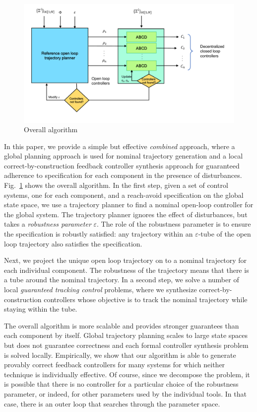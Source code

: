 \begin{figure}[t]
\includegraphics[scale=0.28]{figures/Algorithm_outline.pdf}
\caption{Overall algorithm\label{fig:overall}}
\end{figure}

In this paper, we provide a simple but effective \emph{combined} approach, where a global planning approach is used for nominal trajectory generation and 
a local correct-by-construction feedback controller synthesis approach for guaranteed adherence to specification for each component
in the presence of disturbances.
Fig.~\ref{fig:overall} shows the overall algorithm.
In the first step, 
given a set of control systems, one for each component, and a reach-avoid specification on the global state space, we use a trajectory planner to
find a nominal open-loop controller for the global system.
The trajectory planner ignores the effect of disturbances, but takes a \emph{robustness parameter} $\varepsilon$.
The role of the robustness parameter is to ensure the specification is robustly satisfied: any trajectory within an $\varepsilon$-tube
of the open loop trajectory also satisfies the specification.

Next, we project the unique open loop trajectory on to a nominal trajectory for each individual component.
The robustness of the trajectory means that there is a tube around the nominal trajectory.
In a second step, we solve a number of local \emph{guaranteed tracking control} problems, where we synthesize correct-by-construction
controllers whose objective is to track the nominal trajectory while staying within the tube.

The overall algorithm is more scalable and provides stronger guarantees than each component by itself.
Global trajectory planning scales to large state spaces but does not guarantee correctness
and each formal controller synthesis problem is solved locally.
Empirically, we show that our algorithm is able to generate provably correct feedback controllers for many
systems for which neither technique is individually effective.
Of course, since we decompose the problem, it is possible that there is no controller for a particular choice of the
robustness parameter, or indeed, for other parameters used by the individual tools.
In that case, there is an outer loop that searches through the parameter space.



